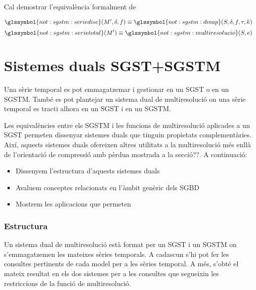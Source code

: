 Cal demostrar l'equivalència formalment de 


\[
\glssymbol{not:sgstm:seriedisc}(M',\delta,f) \equiv
\glssymbol{not:sgstm:dmap}(S,\delta,f,\tau,k)
\]
\[
\glssymbol{not:sgstm:serietotal}(M') \equiv \glssymbol{not:sgstm:multiresolucio}(S,e)
\]












\chapter{Sistemes duals SGST+SGSTM}
\label{sec:multiresolucio:dual}




Una sèrie temporal es pot emmagatzemar i gestionar en un \gls{SGST} o
en un \gls{SGSTM}. També es pot plantejar un sistema dual de
multiresolució on una sèrie temporal es tracti alhora en un \gls{SGST}
i en un \gls{SGSTM}.

Les equivalències entre els \gls{SGSTM} i les funcions de
multiresolució aplicades a un \gls{SGST} permeten dissenyar sistemes
duals que tinguin propietats complementàries.  Així, aquests sistemes
duals ofereixen altres utilitats a la multiresolució més enllà de
l'orientació de compressió amb pèrdua mostrada a la secció??. A continuació:
\begin{itemize}
\item Dissenyem l'estructura d'aquests sistemes duals
\item Avaluem conceptes relacionats en l'àmbit genèric dels \gls{SGBD}
\item Mostrem les aplicacions que permeten
\end{itemize}




\subsection{Estructura}

Un sistema dual de multiresolució està format per un \gls{SGST} i un
\gls{SGSTM} on s'emmagatzemen les mateixes sèries temporals. A
cadascun s'hi pot fer les consultes pertinents de cada model per a les
sèries temporal. A més, s'obté el mateix resultat en els dos sistemes
per a les consultes que segueixin les restriccions de la funció de
multiresolució.


